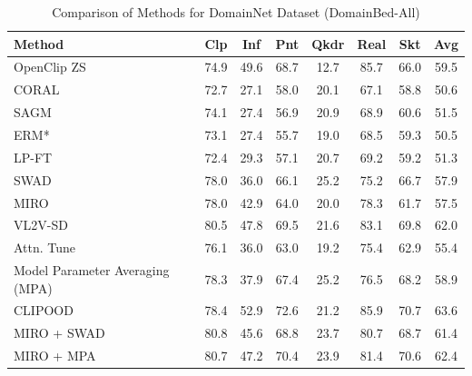 \documentclass{article} %
\begin{document}
\begin{table}[t]
\small
\centering
\caption{Comparison of Methods for DomainNet Dataset (DomainBed-All)}
\begin{tabular}{lccccccc}
\toprule
\textbf{Method} & Clp & Inf & Pnt & Qkdr & Real & Skt & Avg \\ \midrule
OpenClip ZS & 74.9 & 49.6 & 68.7 & 12.7 & 85.7 & 66.0 & 59.5\\
\midrule
CORAL & 72.7 & 27.1 & 58.0 & 20.1 & 67.1 & 58.8 & 50.6 \\ 
SAGM & 74.1 & 27.4 & 56.9 & 20.9 & 68.9 & 60.6 & 51.5 \\ 
ERM* & 73.1 & 27.4 & 55.7 & 19.0 & 68.5 & 59.3 & 50.5 \\ 
LP-FT & 72.4 & 29.3 & 57.1 & 20.7 & 69.2 & 59.2 & 51.3 \\ 
SWAD & 78.0 & 36.0 & 66.1 & 25.2 & 75.2 & 66.7 & 57.9 \\ 
MIRO & 78.0 & 42.9 & 64.0 & 20.0 & 78.3 & 61.7 & 57.5 \\ 
VL2V-SD & 80.5 & 47.8 & 69.5 & 21.6 & 83.1 & 69.8 & 62.0 \\ 
Attn. Tune & 76.1 & 36.0 & 63.0 & 19.2 & 75.4 & 62.9 & 55.4 \\ 
Model Parameter Averaging (MPA) & 78.3 & 37.9 & 67.4 & 25.2 & 76.5 & 68.2 & 58.9 \\ 
CLIPOOD & 78.4  & 52.9 &  72.6  & 21.2  & 85.9 &70.7 & 63.6 \\\hline
MIRO + SWAD & 80.8 & 45.6 & 68.8 & 23.7 & 80.7 & 68.7 & 61.4 \\ 
MIRO + MPA & 80.7 & 47.2 & 70.4 & 23.9 & 81.4 & 70.6 & 62.4 \\ 
\bottomrule
\end{tabular}
\label{table:DomainNet overall}
\end{table}
\end{document}
